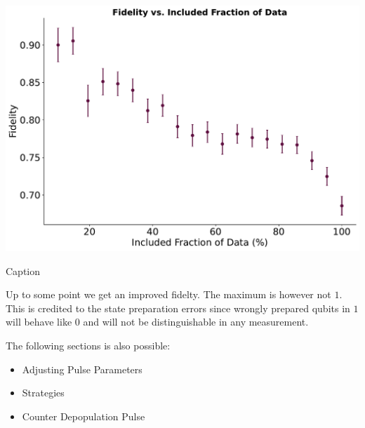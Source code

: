 \begin{marginfigure}
    \centering
    \includegraphics[]{Readout/Figs/fidelity_vs_included_fraction.pdf}
    \caption{Caption}
    \label{fig:enter-label}
\end{marginfigure}

Up to some point we get an improved fidelty. The maximum is however not $1$. This is credited to the state preparation errors since wrongly prepared qubits in $1$ will behave like $0$ and will not be distinguishable in any measurement. 


The following sections is also possible:
\begin{itemize}
    \item Adjusting Pulse Parameters
    \item Strategies
    \item Counter Depopulation Pulse
\end{itemize}




